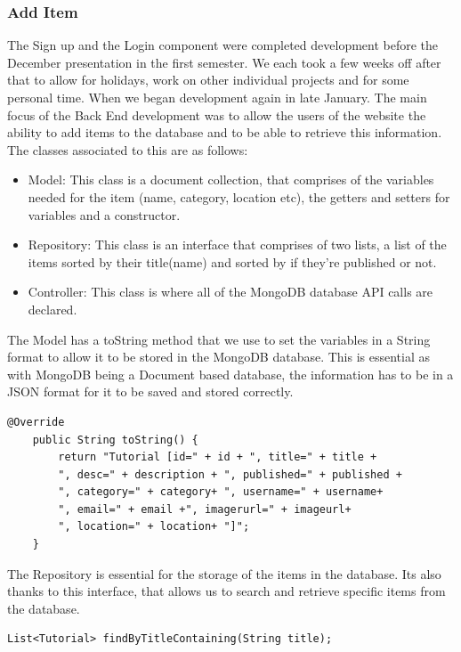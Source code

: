 \subsubsection{Add Item}
The Sign up and the Login component were completed development before the December presentation in the first semester. We each took a few weeks off after that to allow for holidays, work on other individual projects and for some personal time. When we began development again in late January. The main focus of the Back End development was to allow the users of the website the ability to add items to the database and to be able to retrieve this information. The classes associated to this are as follows: \par
\begin{itemize}
    \item Model: This class is a document collection, that comprises of the variables needed for the item (name, category, location etc), the getters and setters for variables and a constructor.
    \item Repository: This class is an interface that comprises of two lists, a list of the items sorted by their title(name) and sorted by if they're published or not.
    \item Controller: This class is where all of the MongoDB database API calls are declared.
\end{itemize}
\par The Model has a toString method that we use to set the variables in a String format to allow it to be stored in the MongoDB database. This is essential as with MongoDB being a Document based database, the information has to be in a JSON format for it to be saved and stored correctly. \par
\begin{verbatim}
@Override
    public String toString() {
        return "Tutorial [id=" + id + ", title=" + title + 
        ", desc=" + description + ", published=" + published +
        ", category=" + category+ ", username=" + username+ 
        ", email=" + email +", imagerurl=" + imageurl+ 
        ", location=" + location+ "]";
    }
\end{verbatim}
The Repository is essential for the storage of the items in the database. Its also thanks to this interface, that allows us to search and retrieve specific items from the database. \par
\begin{verbatim}
List<Tutorial> findByTitleContaining(String title);
\end{verbatim}
